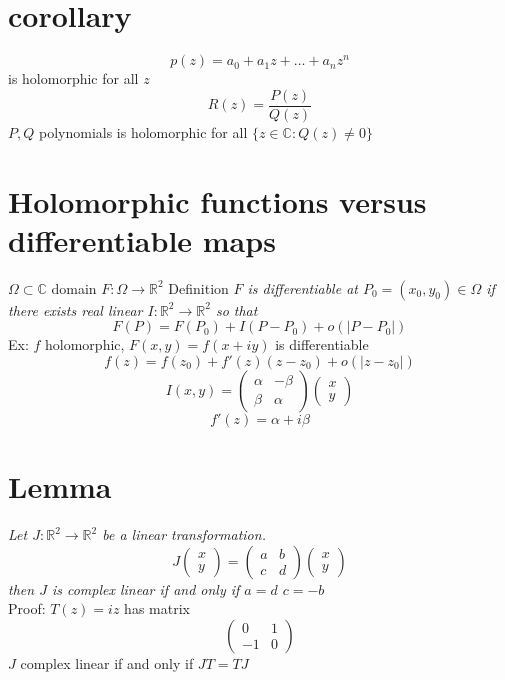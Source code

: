 \documentclass[11pt]{article}
\begin{document}
\section{corollary}
\[
p(z) = a_0 + a_1z + \dots + a_nz^{n}
\] is holomorphic for all $z$ 
\[
R(z) = \frac{P(z)}{Q(z)} \]
$P,Q$ polynomials is holomorphic for all $\{z \in \mathbb{C}: Q(z) \ne 0\}$ 

\section{Holomorphic functions versus differentiable maps}
$\Omega \subset \mathbb{C}$  domain $F : \Omega \rightarrow \mathbb{R}^2$
Definition \emph{$F$ is differentiable at $P_0 = (x_0,y_0) \in \Omega$ if there exists real linear
    $I : \mathbb{R}^2 \rightarrow \mathbb{R}^2$ so that
    \[
    F(P) =  F(P_0) + I(P - P_0) + o( |P- P_0|)
    \] 
}
Ex: $f$ holomorphic, $F(x,y) = f(x + iy)$ is differentiable
 \[
f(z) = f(z_0) + f'(z)(z-z_0) + o(|z-z_0|)
\] 
\[
    I(x,y) = \begin{pmatrix} \alpha & -\beta \\ \beta & \alpha \end{pmatrix} \begin{pmatrix} x \\ y \end{pmatrix} 
\] 
\[
f'(z) = \alpha + i\beta
\] 

\section{Lemma}
\emph{
Let $J : \mathbb{R}^2 \rightarrow \mathbb{R}^2$  be a linear transformation. 
\[
    J \begin{pmatrix} x \\ y \end{pmatrix}  = \begin{pmatrix} a & b \\ c & d \end{pmatrix}  \begin{pmatrix} x \\ y \end{pmatrix} 
\] 
then $J$ is complex linear if and only if $a = d$ $c = -b$ \\
}
Proof:  $T(z) = iz$ has matrix
 \[
     \begin{pmatrix} 0 & 1 \\ -1 & 0 \end{pmatrix} 
\] 
$J$ complex linear if and only if $JT = TJ$
\end{document}
